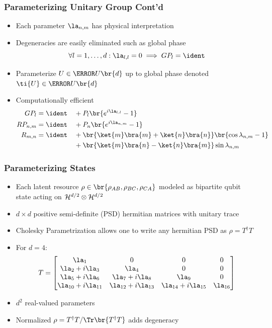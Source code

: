 \documentclass[
    hyperref={bookmarks=false},%
    xcolor={dvipsnames},
]{beamer}
\renewcommand{\term}[1]{\textcolor{Mahogany}{#1}}
\begin{document}
\begin{frame}
    \frametitle{Parameterizing Unitary Group Cont'd}
    \begin{itemize}
        \item Each parameter $\la_{n,m}$ has physical interpretation
        \item Degeneracies are easily eliminated such as global phase
        \[ \forall l = 1, \ldots, d : \la_{l,l} = 0 \implies GP_{l} = \ident \]
        \item Parameterize $U \in \s{U}\br{d}$ up to global phase denoted $\ti{U} \in \s{U}\br{d}$
        \item Computationally efficient
        \begin{alignat*}{2}
            GP_l &= \ident &&+ P_l \br{e^{i\la_{l,l}} - 1} \\
            RP_{n,m} &= \ident &&+ P_n \br{e^{i\la_{n,m}} - 1} \\
            R_{m,n} &= \ident &&+ \br{\ket{m}\bra{m} + \ket{n}\bra{n}} \br{\cos\lambda_{n,m} - 1} \\
            & &&+ \br{\ket{m}\bra{n} - \ket{n}\bra{m}} \sin\lambda_{n,m} \\
        \end{alignat*}
    \end{itemize}
\end{frame}

\begin{frame}
    \frametitle{Parameterizing States}
    \begin{itemize}
        \item Each latent resource $\rho \in \br{\rho_{AB}, \rho_{BC}, \rho_{CA}}$ modeled as bipartite qubit state acting on $\mathcal{H}^{d/2} \otimes \mathcal{H}^{d/2}$
        \item $d \times d$ positive semi-definite (PSD) hermitian matrices with unitary trace
        \item \term{Cholesky Parametrization} allows one to write any hermitian PSD as $\rho = T^{\dagger} T$
        \item For $d = 4$:
        \[ T = \begin{bmatrix}\la_{1}&0&0&0\\\la_{2} + i \la_{3}&\la_{4}&0&0\\\la_{5} + i \la_{6}&\la_{7} + i \la_{8}&\la_{9}&0\\\la_{10} + i \la_{11}&\la_{12} + i \la_{13}&\la_{14} + i \la_{15}&\la_{16}\end{bmatrix} \]
        \item $d^2$ real-valued parameters
        \item Normalized $\rho = {T^{\dagger}T}/{\Tr\br{T^{\dagger} T}}$ adds degeneracy
    \end{itemize}
\end{frame}
\end{document}
